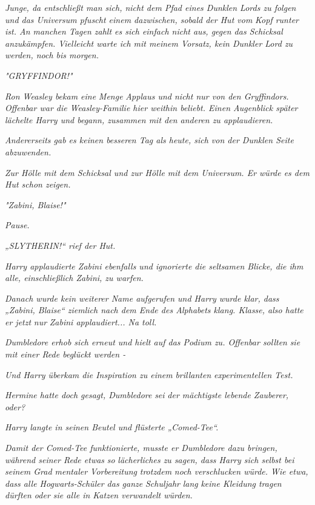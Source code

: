 {\emph{\emph{Junge, da entschließt man sich, nicht dem Pfad eines Dunklen Lords zu folgen und das Universum pfuscht einem dazwischen, sobald der Hut vom}} \emph{\emph{Kopf runter ist. An manchen Tagen zahlt es sich einfach nicht aus, gegen das Schicksal anzukämpfen. Vielleicht warte ich mit meinem Vorsatz, kein Dunkler Lord zu werden, noch bis morgen.}}

\emph{"GRYFFINDOR!"}

\emph{Ron Weasley bekam eine} \emph{\emph{Menge}} \emph{Applaus und nicht nur von den Gryffindors. Offenbar war die Weasley-Familie hier weithin beliebt. Einen Augenblick später lächelte Harry und begann, zusammen mit den anderen zu applaudieren.}

\emph{Andererseits gab es keinen besseren Tag als heute, sich von der Dunklen Seite abzuwenden.}

\emph{Zur Hölle mit dem Schicksal und zur Hölle mit dem Universum. Er würde es dem Hut schon zeigen.}

\emph{"Zabini, Blaise!"}

\emph{Pause.}

\emph{„SLYTHERIN!“ rief der Hut.}

\emph{Harry applaudierte Zabini ebenfalls und ignorierte die seltsamen Blicke, die ihm alle, einschließlich Zabini, zu warfen.}

\emph{Danach wurde kein weiterer Name aufgerufen und Harry wurde klar, dass „Zabini, Blaise“ ziemlich nach dem Ende des Alphabets klang. Klasse, also hatte er jetzt} \emph{\emph{nur}} \emph{Zabini applaudiert... Na toll.}

\emph{Dumbledore erhob sich erneut und hielt auf das Podium zu. Offenbar sollten} \emph{sie mit einer Rede beglückt werden -}

\emph{Und Harry überkam die Inspiration zu einem} \emph{\emph{brillanten}} \emph{experimentellen Test.}

\emph{Hermine hatte doch gesagt, Dumbledore} \emph{sei} \emph{der mächtigste lebende Zauberer, oder?}

\emph{Harry langte in seinen Beutel und flüsterte „Comed-Tee“.}

\emph{Damit der Comed-Tee funktionierte, musste er Dumbledore dazu bringen, während seiner Rede etwas} \emph{\emph{so}} \emph{lächerliches zu sagen, dass Harry sich selbst bei seinem Grad mentaler Vorbereitung} \emph{\emph{trotzdem}} \emph{noch verschlucken würde. Wie etwa, dass alle Hogwarts-Schüler das ganze} \emph{Schuljahr} \emph{lang} \emph{keine Kleidung tragen dürften oder sie alle in Katzen verwandelt würden.}

}
